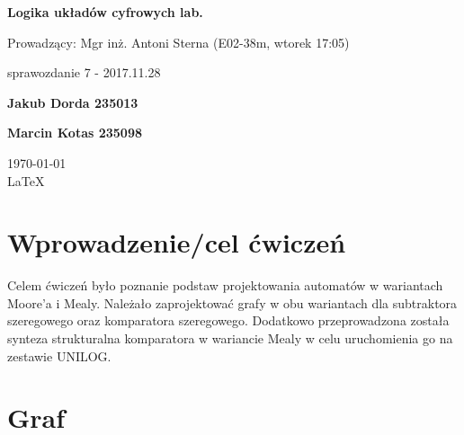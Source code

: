 \documentclass[12pt,a4paper]{article}
\begin{document}
	
	\begin{titlepage}
		
		\centering
		{\huge\bfseries Logika układów cyfrowych lab.\par}
		
		\vspace{0.5cm}
		Prowadzący: Mgr inż. Antoni Sterna (E02-38m, wtorek 17:05) \\
	
		\vspace{1.1cm}
		{\Large sprawozdanie 7 - 2017.11.28\par}
		\vfill
		
		{\large\bfseries Jakub Dorda 235013\par}
		{\large\bfseries Marcin Kotas 235098\par}
		
		\vspace{1cm}
		\today \\ \LaTeX
		
		\restoregeometry
	\end{titlepage}


	\section{Wprowadzenie/cel ćwiczeń}
	
		Celem ćwiczeń było poznanie podstaw projektowania automatów w wariantach Moore'a i Mealy. Należało zaprojektować grafy w obu wariantach dla subtraktora szeregowego oraz komparatora szeregowego. Dodatkowo przeprowadzona została synteza strukturalna komparatora w wariancie Mealy w celu uruchomienia go na zestawie UNILOG.
		
		
	\section{Graf}
	
\end{document}
